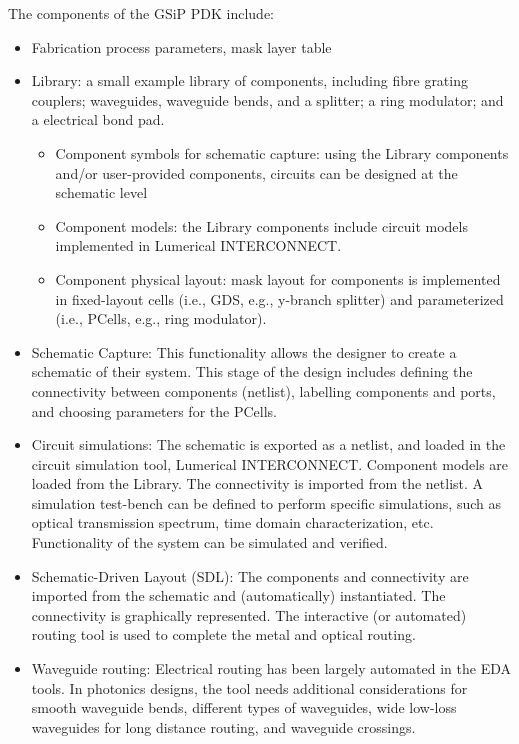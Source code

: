 \documentclass[journal]{spie}
\begin{document}
The components of the GSiP PDK include:
\begin{itemize}
	\item Fabrication process parameters, mask layer table
	\item Library: a small example library of components, including fibre grating couplers; waveguides, waveguide bends, and a splitter; a ring modulator; and a electrical bond pad.  
	\begin{itemize}
		\item Component symbols for schematic capture: using the Library components and/or user-provided components, circuits can be designed at the schematic level
		\item Component models: the Library components include circuit models implemented in Lumerical INTERCONNECT.
		\item Component physical layout: mask layout for components is implemented in fixed-layout cells (i.e., GDS, e.g., y-branch splitter) and parameterized (i.e., PCells, e.g., ring modulator). 
	\end{itemize}
	\item Schematic Capture: This functionality allows the designer to create a schematic of their system.  This stage of the design includes defining the connectivity between components (netlist), labelling components and ports, and choosing parameters for the PCells.
	\item Circuit simulations: The schematic is exported as a netlist, and loaded in the circuit simulation tool, Lumerical INTERCONNECT.  Component models are loaded from the Library.  The connectivity is imported from the netlist.  A simulation test-bench can be defined to perform specific simulations, such as optical transmission spectrum, time domain characterization, etc.  Functionality of the system can be simulated and verified.
	\item Schematic-Driven Layout (SDL):  The components and connectivity are imported from the schematic and (automatically) instantiated.  The connectivity is graphically represented.  The interactive (or automated) routing tool is used to complete the metal and optical routing.
	\item Waveguide routing: Electrical routing has been largely automated in the EDA tools.  In photonics designs, the tool needs additional considerations for smooth waveguide bends,  different types of waveguides,  wide low-loss waveguides for long distance routing, and waveguide crossings.


\end{itemize}
\end{document}
